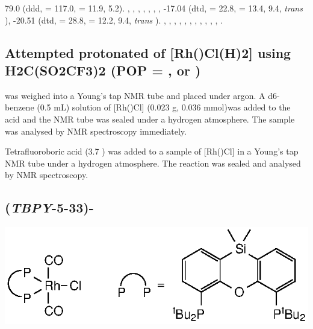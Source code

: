 79.0 (ddd, \JRhP{} = 117.0, \JPH{} = 11.9, 5.2).
,
,
,
,
,
,
,
-17.04 (dtd, \JRhH{} = 22.8, \JPH{} = 13.4, \JHH{} 9.4,  \emph{trans} ),
-20.51 (dtd, \JRhH{} = 28.8, \JPH{} = 12.2, \JHH{} 9.4,  \emph{trans} ).
,
,
,
,
,
,
,
,
,
,
,
.


\subsection*{Attempted protonated of [Rh(\POP)Cl(H)2] using H2C(SO2CF3)2 (POP = \tBusixantphos, \tButhixantphos{} or \tBuxantphos)}

 was weighed into a Young's tap NMR tube and placed under argon.  A d6-benzene (0.5 mL) solution of [Rh(\POP)Cl] (0.023 g, 0.036 mmol)was added to the acid and the NMR tube was sealed under a hydrogen atmosphere.  The sample was analysed by NMR spectroscopy immediately.  


Tetrafluoroboric acid (3.7 ) was added to a sample of [Rh(\POP)Cl] in a Young's tap NMR tube under a hydrogen atmosphere.  The reaction was sealed and analysed by NMR spectroscopy.  


\subsection*{(\emph{TBPY}-5-33)-}

\begin{structure}[h]
\begin{center}
\includegraphics{../Structures/RhCl(SitBu)(CO)2.eps}
\end{center}
\end{structure}

